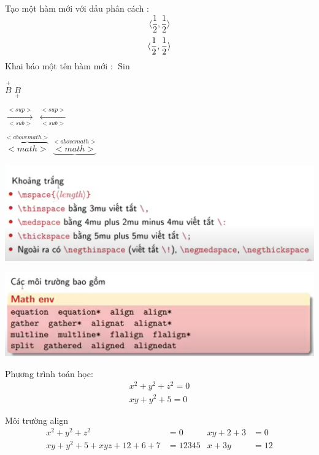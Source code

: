 \documentclass[12pt]{article}
\DeclareMathOperator{\Hamsin}{Sin}
\DeclarePairedDelimiter{\tvh}{\langle}{\rangle}
\begin{document}
Tạo một hàm mới với dấu phân cách :
$$ \langle \frac{1}{2}, \frac{1}{2} \rangle $$ 
$$ \tvh{\frac{1}{2}, \frac{1}{2}} $$
Khai báo một tên hàm mới : $\Hamsin$

\vspace{1cm}

$\overset{+}{B}$
$\underset{+}{B}$

\vspace{1cm}

$\xrightarrow[<sub>]{<sup>}$
$\xleftarrow[<sub>]{<sup>}$

\vspace{1cm}

$\overbrace{<math>}^{<above math>}$
$\underbrace{<math>}^{<above math>}$

\includegraphics[scale=0.6]{image/space.png}

\includegraphics[scale=0.6]{image/math-environment.png}

Phương trình toán học:
\begin{equation}
	\begin{split}
    	x^2+y^2+z^2=0\\
    	xy+y^2+5=0
	\end{split}
\end{equation}

Môi trường align
\begin{align}
    x^2+y^2+z^2&=0 & xy+2+3&=0\\
    xy+y^2+5+xyz+12+6+7&=12345 & x+3y&=12 
\end{align}
\end{document}
